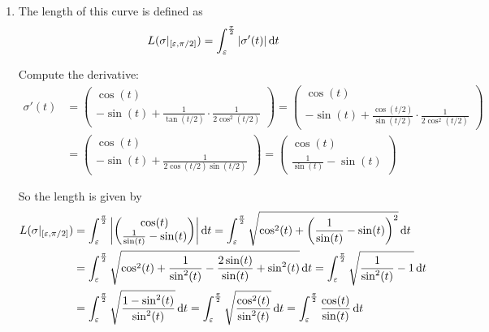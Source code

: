 \documentclass[12pt]{article}
\begin{document}
\begin{enumerate}
    \item The length of this curve is defined as
    \begin{align*}
        L(\sigma|_{[\varepsilon, \pi/2]}) = \int_{\varepsilon}^{\frac{\pi}{2}} |\sigma'(t)| \mathop{}\!\mathrm{d} t
    \end{align*}

    Compute the derivative:
    \begin{align*}
        \sigma'(t) &= 
        \begin{pmatrix}
            \cos(t) \\
            -\sin(t) + \frac{1}{\tan(t/2)}\cdot\frac{1}{2\cos^2(t/2)}
        \end{pmatrix} =
        \begin{pmatrix}
            \cos(t) \\
            -\sin(t) + \frac{\cos(t/2)}{\sin(t/2)}\cdot\frac{1}{2\cos^2(t/2)}
        \end{pmatrix} \\
        &= \begin{pmatrix}
            \cos(t) \\
            -\sin(t) + \frac{1}{2\cos(t/2)\sin(t/2)}
        \end{pmatrix} = 
        \begin{pmatrix}
            \cos(t) \\
            \frac{1}{\sin(t)} - \sin(t)
        \end{pmatrix}
    \end{align*}

    So the length is given by
    \begin{align*}
        L(\sigma|_{[\varepsilon, \pi/2]}) &= \int_{\varepsilon}^{\frac{\pi}{2}} \left|
        \begin{pmatrix}
            \cos(t) \\
            \frac{1}{\sin(t)} - \sin(t)
        \end{pmatrix}
        \right| \mathop{}\!\mathrm{d} t = 
        \int_{\varepsilon}^{\frac{\pi}{2}} \sqrt{
        \cos^2(t) + \left(\frac{1}{\sin(t)} - \sin(t)\right)^2}
        \mathop{}\!\mathrm{d} t \\
        &= \int_{\varepsilon}^{\frac{\pi}{2}} \sqrt{
        \cos^2(t) + \frac{1}{\sin^2(t)} - \frac{2\sin(t)}{\sin(t)} + \sin^2(t)} \mathop{}\!\mathrm{d} t
        =
        \int_{\varepsilon}^{\frac{\pi}{2}} \sqrt{
        \frac{1}{\sin^2(t)} - 1} \mathop{}\!\mathrm{d} t \\
        &= \int_{\varepsilon}^{\frac{\pi}{2}} \sqrt{
        \frac{1 - \sin^2(t)}{\sin^2(t)}} \mathop{}\!\mathrm{d} t
        = 
        \int_{\varepsilon}^{\frac{\pi}{2}} \sqrt{
        \frac{\cos^2(t)}{\sin^2(t)}} \mathop{}\!\mathrm{d} t
        =
        \int_{\varepsilon}^{\frac{\pi}{2}}
        \frac{\cos(t)}{\sin(t)}\mathop{}\!\mathrm{d} t \\
    \end{align*}


\end{enumerate}
\end{document}
